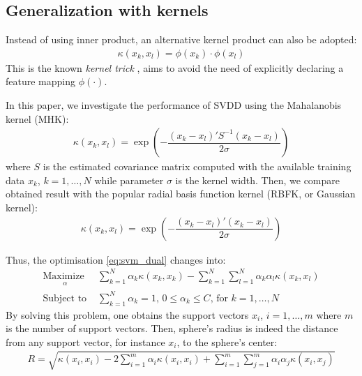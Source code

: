 \documentclass[3p]{elsarticle}
\theoremstyle{problemstyle}
\begin{document}
\subsection{Generalization with kernels}

Instead of using inner product, an alternative kernel product can also be adopted:
\begin{align}
\kappa \left( x_k, x_l \right) = \phi \left( x_k \right) \cdot \phi \left( x_l \right)
\end{align}
This is the known \emph{kernel trick} \cite{Scholkopf2001}, aims to avoid the need of explicitly declaring a feature mapping $\phi \left( \cdot \right)$. 

In this paper, we investigate the performance of SVDD using the Mahalanobis kernel (MHK):
\begin{align}
\kappa \left( x_k, x_l \right) = \exp \left( -\dfrac{ \left( x_k - x_l \right)'S^{-1}\left( x_k - x_l \right) }{2\sigma} \right)
\end{align}
where $S$ is the estimated covariance matrix computed with the available training data $x_k$, $k=1,\dots,N$ while parameter $\sigma$ is the kernel width. Then, we compare obtained result with the popular radial basis function kernel (RBFK, or Gaussian kernel):
\begin{align}
\kappa \left( x_k, x_l \right) = \exp \left( -\dfrac{ \left( x_k - x_l \right)'\left( x_k - x_l \right) }{2\sigma} \right)
\end{align}

Thus, the optimisation \eqref{eq:svm_dual} changes into:
\begin{subequations}\label{eq:svm_dual_kernel}
\begin{align}
\underset{
	\begin{array}{c}
		 \alpha
	\end{array}}{\text{Maximize }} &\sum_{k=1}^N \alpha_k \kappa \left( x_k, x_k \right)  - \sum_{k=1}^N \sum_{l=1}^N \alpha_k \alpha_l \kappa \left( x_k, x_l \right)  \\
\text{Subject to } &\sum_{k=1}^N \alpha_k = 1 \text{, } 0 \le \alpha_k \le C \text{, for } k=1,\dots,N
\end{align}
\end{subequations}
By solving this problem, one obtains the support vectors $x_i$, $i=1,\dots,m$ where $m$ is the number of support vectors. Then, sphere's radius is indeed the distance from any support vector, for instance $x_i$, to the sphere's center:
\begin{align}
R = \sqrt{\kappa \left( x_i, x_i \right) - 2 \sum_{i=1}^m \alpha_i \kappa \left( x_i, x_i \right) + \sum_{i=1}^m \sum_{j=1}^m \alpha_i \alpha_j \kappa \left( x_i, x_j \right)}
\end{align}
\end{document}
